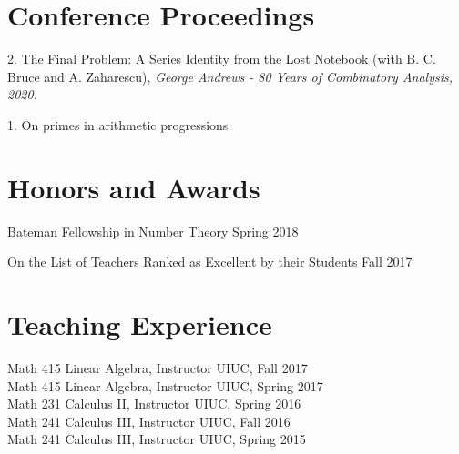 \documentclass[margin,line,pifont,palatino,courier]{res}
\begin{document}
\begin{resume}
\section{\sc Conference Proceedings}
2. {The Final Problem: A Series Identity from the Lost Notebook} (with B. C. Bruce and A. Zaharescu), {\it George Andrews - 80 Years of Combinatory Analysis, 2020.}

1. {On primes in arithmetic progressions}
 
 







\section{\sc Honors and Awards}


{Bateman Fellowship in Number Theory} \hfill{Spring 2018}


{On the List of Teachers Ranked as Excellent by their Students} \hfill{Fall 2017}

%
%
%
%
%
%
%


\section{\sc Teaching Experience}
Math 415 Linear Algebra, Instructor {\hfill  UIUC, Fall 2017}\\
Math 415 Linear Algebra, Instructor {\hfill  UIUC, Spring 2017}\\
Math 231 Calculus II, Instructor {\hfill  UIUC, Spring 2016}\\
Math 241 Calculus III, Instructor {\hfill  UIUC, Fall 2016} \\
Math 241 Calculus III, Instructor {\hfill  UIUC, Spring 2015}



\end{resume}
\end{document}
